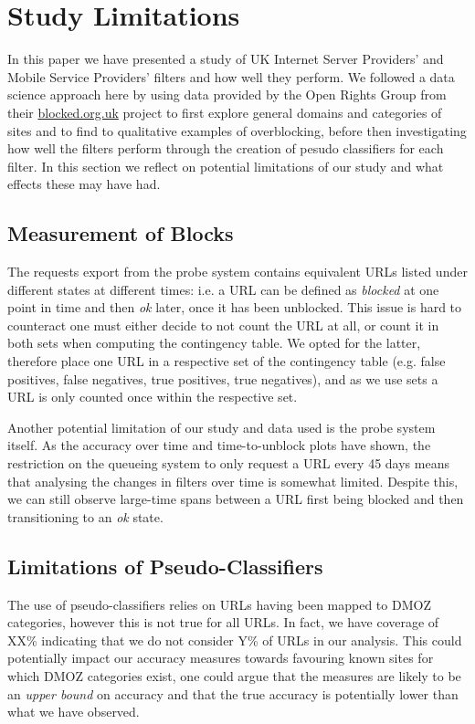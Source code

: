 \documentclass{bmcart}
\begin{document}
\begin{figure}[h!]
\label{fig:isps-unblock-dist}
\end{figure}



\section*{Study Limitations}
In this paper we have presented a study of UK Internet Server Providers' and Mobile Service Providers' filters and how well they perform.
We followed a data science approach here by using data provided by the Open Rights Group from their \url{blocked.org.uk} project to first explore general domains and categories of sites and to find to qualitative examples of overblocking, before then investigating how well the filters perform through the creation of pesudo classifiers for each filter.
In this section we reflect on potential limitations of our study and what effects these may have had.

\subsection*{Measurement of Blocks}
The requests export from the probe system contains equivalent URLs listed under different states at different times: i.e. a URL can be defined as \textit{blocked} at one point in time and then \textit{ok} later, once it has been unblocked.
This issue is hard to counteract one must either decide to not count the URL at all, or count it in both sets when computing the contingency table.
We opted for the latter, therefore place one URL in a respective set of the contingency table (e.g. false positives, false negatives, true positives, true negatives), and as we use sets a URL is only counted once within the respective set.

Another potential limitation of our study and data used is the probe system itself. 
As the accuracy over time and time-to-unblock plots have shown, the restriction on the queueing system to only request a URL every 45 days means that analysing the changes in filters over time is somewhat limited.
Despite this, we can still observe large-time spans between a URL first being blocked and then transitioning to an \textit{ok} state.

\subsection*{Limitations of Pseudo-Classifiers}
The use of pseudo-classifiers relies on URLs having been mapped to DMOZ categories, however this is not true for all URLs.
In fact, we have coverage of XX\% indicating that we do not consider Y\% of URLs in our analysis.
This could potentially impact our accuracy measures towards favouring known sites for which DMOZ categories exist, one could argue that the measures are likely to be an \textit{upper bound} on accuracy and that the true accuracy is potentially lower than what we have observed.
\end{document}
